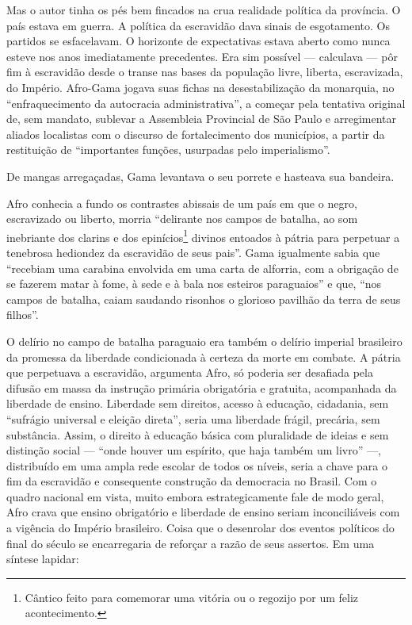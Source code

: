 Mas o autor tinha os pés bem fincados na crua realidade política da
província. O país estava em guerra. A política da escravidão dava sinais
de esgotamento. Os partidos se esfacelavam. O horizonte de expectativas
estava aberto como nunca esteve nos anos imediatamente precedentes. Era
sim possível --- calculava --- pôr fim à escravidão desde o transe nas
bases da população livre, liberta, escravizada, do Império.
Afro-Gama jogava suas fichas na desestabilização da monarquia, no
``enfraquecimento da autocracia administrativa'', a começar pela tentativa
original de, sem mandato, sublevar a Assembleia Provincial de São Paulo
e arregimentar aliados localistas com o discurso de fortalecimento dos
municípios, a partir da restituição de ``importantes funções, usurpadas
pelo imperialismo''.

De mangas arregaçadas, Gama levantava o seu porrete e hasteava sua
bandeira.

Afro conhecia a fundo os contrastes abissais de um país em que o
negro, escravizado ou liberto, morria ``delirante nos campos de batalha,
ao som inebriante dos clarins e dos epinícios\footnote{Cântico feito
  para comemorar uma vitória ou o regozijo por um feliz acontecimento.}
divinos entoados à pátria para perpetuar a tenebrosa hediondez da
escravidão de seus pais''. Gama igualmente sabia que ``recebiam uma
carabina envolvida em uma carta de alforria, com a obrigação de se
fazerem matar à fome, à sede e à bala nos esteiros paraguaios'' e que,
``nos campos de batalha, caiam saudando risonhos o glorioso pavilhão da
terra de seus filhos''.

O delírio no campo de batalha paraguaio era também o delírio imperial
brasileiro da promessa da liberdade condicionada à certeza da morte em
combate. A pátria que perpetuava a escravidão, argumenta Afro, só
poderia ser desafiada pela difusão em massa da instrução primária
obrigatória e gratuita, acompanhada da liberdade de ensino. Liberdade
sem direitos, acesso à educação, cidadania, sem ``sufrágio universal e
eleição direta'', seria uma liberdade frágil, precária, sem substância.
Assim, o direito à educação básica com pluralidade de ideias e sem
distinção social --- ``onde houver um espírito, que haja também um livro''
---, distribuído em uma ampla rede escolar de todos os níveis, seria a
chave para o fim da escravidão e consequente construção da democracia no
Brasil. Com o quadro nacional em vista, muito embora estrategicamente
fale de modo geral, Afro crava que ensino obrigatório e liberdade
de ensino seriam inconciliáveis com a vigência do Império brasileiro.
Coisa que o desenrolar dos eventos políticos do final do século se
encarregaria de reforçar a razão de seus assertos. Em uma síntese
lapidar:

